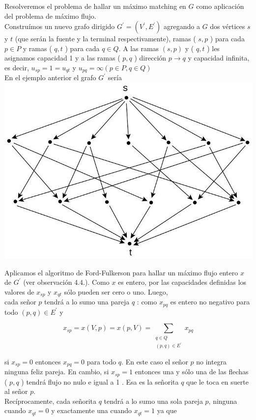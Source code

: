\documentclass[10pt]{article}
\begin{document}
Resolveremos el problema de hallar un máximo matching en $G$ como aplicación del problema de máximo flujo.\\
Construímos un nuevo grafo dirigido $G^{\prime}=\left(V^{\prime}, E^{\prime}\right)$ agregando a $G$ dos vértices $s$ y $t$ (que serán la fuente y la terminal respectivamente), ramas ( $s, p$ ) para cada $p \in P$ y ramas ( $q, t$ ) para cada $q \in Q$. A las ramas $(s, p)$ y ( $q, t$ ) les asignamos capacidad 1 y a las ramas ( $p, q$ ) dirección $p \longrightarrow q$ y capacidad infinita, es decir, $u_{s p}=1=u_{q t}$ y $u_{p q}=\infty(p \in P, q \in Q)$\\
En el ejemplo anterior el grafo $G^{\prime}$ sería\\
\includegraphics[max width=\textwidth, center]{2025_09_05_aa5f7b8425e7dd302062g-15}

Aplicamos el algoritmo de Ford-Fulkerson para hallar un máximo flujo entero $x$ de $G^{\prime}$ (ver observación 4.4.). Como $x$ es entero, por las capacidades definidas los valores de $x_{s p}$ y $x_{q t}$ sólo pueden ser cero o uno. Luego,\\
cada señor $p$ tendrá a lo sumo una pareja $q$ : como $x_{p q}$ es entero no negativo para todo $(p, q) \in E^{\prime}$ y

$$
x_{s p}=x(V, p)=x(p, V)=\sum_{\substack{q \in Q \\(p, q) \in E^{\prime}}} x_{p q}
$$

si $x_{s p}=0$ entonces $x_{p q}=0$ para todo $q$. En este caso el señor $p$ no integra ninguna feliz pareja. En cambio, si $x_{s p}=1$ entonces una y sólo una de las flechas ( $p, q$ ) tendrá flujo no nulo e igual a 1 . Esa es la señorita $q$ que le toca en suerte al señor $p$.\\
Recíprocamente, cada señorita $q$ tendrá a lo sumo una sola pareja $p$, ninguna cuando $x_{q t}=0$ y exactamente una cuando $x_{q t}=1$ ya que
\end{document}

